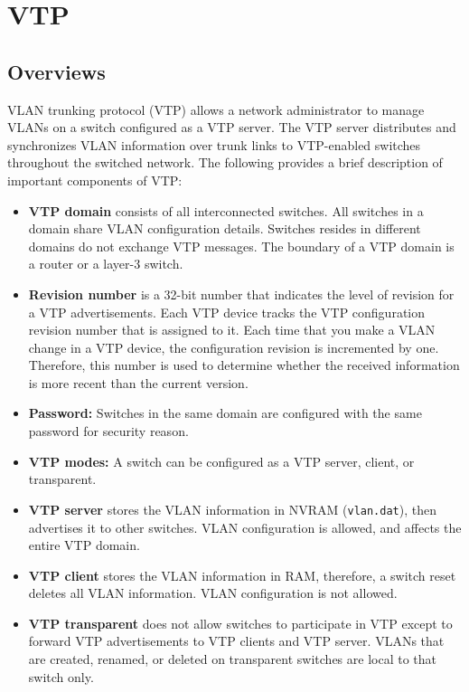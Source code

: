 \chapter{VTP}
\section{Overviews}
VLAN trunking protocol (VTP) allows a network administrator to manage VLANs on a switch configured as a VTP server. The VTP server distributes and synchronizes VLAN information over trunk links to VTP-enabled switches throughout the switched network. The following provides a brief description of important components of VTP:

\begin{itemize}
\item \textbf{VTP domain} consists of all interconnected switches. All switches in a domain share VLAN configuration details. Switches resides in different domains do not exchange VTP messages. The boundary of a VTP domain is a router or a layer-3 switch.

\item \textbf{Revision number} is a 32-bit number that indicates the level of revision for a VTP advertisements. Each VTP device tracks the VTP configuration revision number that is assigned to it. Each time that you make a VLAN change in a VTP device, the configuration revision is incremented by one. Therefore, this number is used to determine whether the received information is more recent than the current version.

\item \textbf{Password:} Switches in the same domain are configured with the same password for security reason.

\item \textbf{VTP modes:} A switch can be configured as a VTP server, client, or transparent.

\item \textbf{VTP server} stores the VLAN information in NVRAM (\verb|vlan.dat|), then advertises it to other switches. VLAN configuration is allowed, and affects the entire VTP domain.

\item \textbf{VTP client} stores the VLAN information in RAM, therefore, a switch reset deletes all VLAN information. VLAN configuration is not allowed.

\item \textbf{VTP transparent} does not allow switches to participate in VTP except to forward VTP advertisements to VTP clients and VTP server. VLANs that are created, renamed, or deleted on transparent switches are local to that switch only.
\end{itemize}

